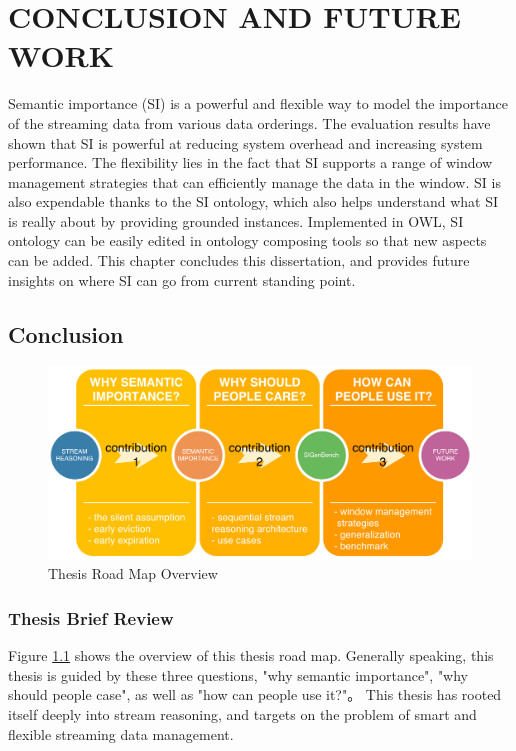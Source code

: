  
\chapter{CONCLUSION AND FUTURE WORK}
Semantic importance (SI) is a powerful and flexible way to model the importance of the streaming data from various data orderings.
The evaluation results have shown that SI is powerful at reducing system overhead and increasing system performance. 
The flexibility lies in the fact that SI supports a range of window management strategies that can efficiently manage the data in the window. 
SI is also expendable thanks to the SI ontology, which also helps understand what SI is really about by providing grounded instances.
Implemented in OWL, SI ontology can be easily edited in ontology composing tools so that new aspects can be added. 
This chapter concludes this dissertation, and provides future insights on where SI can go from current standing point. 
%
\section{Conclusion}

\begin{figure}[!htbp]
	\centering
    \includegraphics[width=5.5in]{img/7-trm.pdf}
    \caption{Thesis Road Map Overview}
    \label{fig:7-trm}
\end{figure}
%
\subsection{Thesis Brief Review}
Figure \ref{fig:7-trm} shows the overview of this thesis road map. 
Generally speaking, this thesis is guided by these three questions, 
"why semantic importance", "why should people case", as well as "how can people use it?"。
This thesis has rooted itself deeply into stream reasoning, and targets on the problem of smart and flexible streaming data management. 

